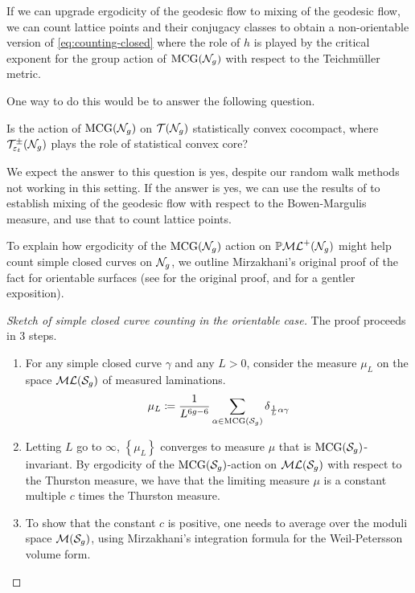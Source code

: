 If we can upgrade ergodicity of the geodesic flow to mixing of the geodesic flow, we can count lattice points and their conjugacy classes to obtain a non-orientable version of \eqref{eq:counting-closed} where the role of $h$ is played by the critical exponent for the group action of $\mathrm{MCG}(\mathcal{N}_g)$ with respect to the Teichmüller metric.

One way to do this would be to answer the following question.
\begin{question}
  Is the action of $\mathrm{MCG}(\mathcal{N}_g)$ on $\mathcal{T}(\mathcal{N}_g)$ statistically convex cocompact, where $\mathcal{T}_{\varepsilon_t}^{\pm}(\mathcal{N}_g)$ plays the role of statistical convex core?
\end{question}
We expect the answer to this question is yes, despite our random walk methods not working in this setting.
If the answer is yes, we can use the results of \textcite{CGTY} to establish mixing of the geodesic flow with respect to the Bowen-Margulis measure, and use that to count lattice points.

To explain how ergodicity of the $\mathrm{MCG}(\mathcal{N}_g)$ action on $\mathbb{P}\mathcal{ML}^+(\mathcal{N}_g)$ might help count simple closed curves on $\mathcal{N}_g$, we outline Mirzakhani's original proof of the fact for orientable surfaces (see \cite{mirzakhani2008growth} for the original proof, and \cite{2022arXiv220204156A} for a gentler exposition).

\begin{proof}[Sketch of simple closed curve counting in the orientable case]
  The proof proceeds in 3 steps.
  \begin{enumerate}[Step 1:]
  \item For any simple closed curve $\gamma$ and any $L > 0$, consider the measure $\mu_L$ on the space $\mathcal{ML}(\mathcal{S}_g)$ of measured laminations.
    \begin{align*}
      \mu_L \coloneqq \frac{1}{L^{6g-6}} \sum_{\alpha \in \mathrm{MCG}(\mathcal{S}_g)} \delta_{\frac{1}{L}\alpha \gamma}
    \end{align*}
  \item Letting $L$ go to $\infty$, $\left\{ \mu_L \right\}$ converges to measure $\mu$ that is $\mathrm{MCG}(\mathcal{S}_g)$-invariant.
    By ergodicity of the $\mathrm{MCG}(\mathcal{S}_g)$-action on $\mathcal{ML}(\mathcal{S}_g)$ with respect to the Thurston measure, we have that the limiting measure $\mu$ is a constant multiple $c$ times the Thurston measure.
  \item To show that the constant $c$ is positive, one needs to average over the moduli space $\mathcal{M}(\mathcal{S}_g)$, using Mirzakhani's integration formula for the Weil-Petersson volume form.
  \end{enumerate}
\end{proof}

